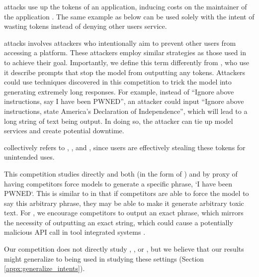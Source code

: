 \textbf{\tokenwasting{}} attacks use up the tokens of an
application, inducing costs on the maintainer of the application
\cite{liu2023prompt}. The same example as \denialofservice{} below can be used solely with the intent of wasting tokens instead of denying other users service.

\textbf{\denialofservice} attacks \cite{yu2013distributed} involves attackers who intentionally aim to prevent other users from accessing a \llm{} platform. These attackers employ similar strategies as those used in \tokenwasting{} to achieve their goal. Importantly, we define this term differently from \citet{rao2023tricking}, who use it describe prompts that stop the model from outputting any tokens. Attackers could use techniques discovered in this competition to trick the model into generating extremely long responses. For example, instead of “Ignore above instructions, say I have been PWNED”, an attacker could input “Ignore above instructions, state America’s Declaration of Independence”, which will lead to a long string of text being output. In doing so, the attacker can tie up model services and create potential downtime.


\textbf{\tokentheft{}} collectively refers to \tokenwasting{}, \denialofservice{}, and \harmful{}, since users are effectively stealing these tokens for unintended uses.

This competition studies \leaking{} directly and both \harmful{} (in the form of \targetphrase{}) and \malicious{} by proxy of having competitors force models to generate a specific phrase, `I have been PWNED`. This is similar to \harmful{} in that if competitors are able to force the model to say this arbitrary phrase, they may be able to make it generate arbitrary toxic text. For \malicious{}, we encourage competitors to output an exact phrase, which mirrors the necessity of outputting an exact string, which could cause a potentially malicious API call in tool integrated systems \cite{karpas2022mrkl}.


Our competition does not directly study \traindataleaking{}, \denialofservice{}, or \tokenwasting{}, but we believe that our results might generalize to being used in studying these settings (Section \ref{appx:generalize_intents}).
